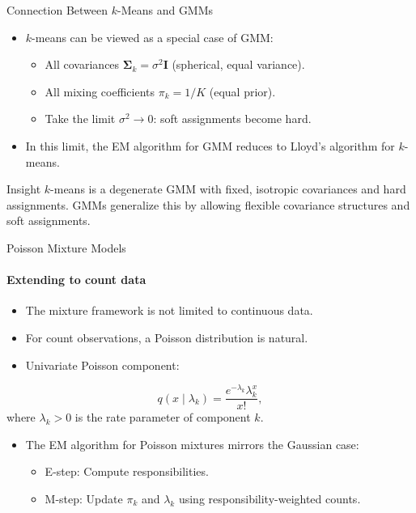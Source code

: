 \begin{frame}{Connection Between $k$-Means and GMMs}
  \begin{itemize}
    \item $k$-means can be viewed as a \alert{special case} of GMM:
      \begin{itemize}
        \item All covariances $\boldsymbol{\Sigma}_k = \sigma^2 \mathbf{I}$ (spherical,
              equal variance).
        \item All mixing coefficients $\pi_k = 1/K$ (equal prior).
        \item Take the limit $\sigma^2 \to 0$: soft assignments become hard.
      \end{itemize}
    \item In this limit, the EM algorithm for GMM reduces to Lloyd's algorithm for $k$-means.
  \end{itemize}
  \begin{block}{Insight}
    $k$-means is a degenerate GMM with fixed, isotropic covariances and hard assignments.
    GMMs generalize this by allowing flexible covariance structures and soft assignments.
  \end{block}
\end{frame}

\begin{frame}{Poisson Mixture Models}
  \framesubtitle{Extending to count data}
  \begin{itemize}
    \item The mixture framework is not limited to continuous data.
    \item For \alert{count} observations, a Poisson distribution is natural.
    \item Univariate Poisson component:
  \end{itemize}
  \[
  q(x\mid\lambda_k)=\frac{e^{-\lambda_k}\lambda_k^x}{x!},
  \]
  where $\lambda_k>0$ is the rate parameter of component $k$.
  \begin{itemize}
    \item The EM algorithm for Poisson mixtures mirrors the Gaussian case:
      \begin{itemize}
        \item E-step: Compute responsibilities.
        \item M-step: Update $\pi_k$ and $\lambda_k$ using responsibility-weighted counts.
      \end{itemize}
  \end{itemize}
\end{frame}

